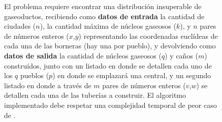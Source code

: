 \documentclass[11pt, a4paper, twoside]{article}
\begin{document}
\begin{figure}


El problema requiere encontrar una distribución insuperable de gaseoductos, recibiendo como
\textbf{datos de entrada} la cantidad de ciudades ($n$), la cantidad máxima de núcleos gaseosos
($k$), y $n$ pares de números enteros ($x$,$y$) representando las coordenadas euclídeas de cada una
de las borneras (hay una por pueblo), y devolviendo como \textbf{datos de salida} la cantidad de
núcleos gaseosos ($q$) y caños ($m$) construídos, junto con un listado en donde se detallen cada uno
de los $q$ pueblos ($p$) en donde se emplazará una central, y un segundo listado en donde a través
de $m$ pares de números enteros ($v$,$w$) se detallen cada una de las tuberías a construir. El
algoritmo implementado debe respetar una complejidad temporal de peor caso de .

\end{figure}
\end{document}
